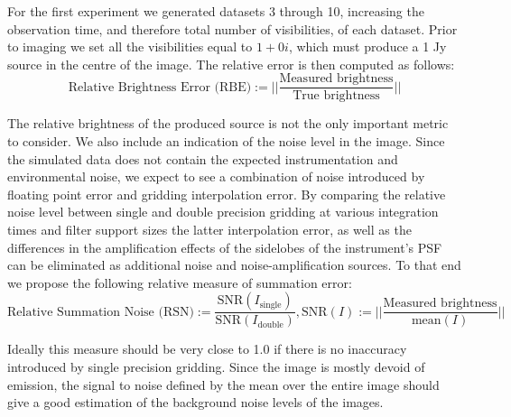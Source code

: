 For the first experiment we generated datasets 3 through 10, increasing the observation time, and therefore total number of visibilities, of each dataset. Prior to imaging we set all the visibilities 
equal to $1+0i$, which must produce a 1 Jy source in the centre of the image. The relative error is then computed as
follows:
\begin{equation}
 \text{Relative Brightness Error (RBE)} := ||\frac{\text{Measured brightness}}{\text{True brightness}}||
\end{equation}

The relative brightness of the produced source is not the only important metric to consider. We also include an indication of the noise level in the image. Since the simulated data does not contain the expected
instrumentation and environmental noise, we expect to see a combination of noise introduced by floating point error and gridding interpolation error. By comparing the relative noise level between single and double 
precision gridding at various integration times and filter support sizes the latter interpolation error, as well as the differences in the amplification effects of the sidelobes of the instrument's PSF can be 
eliminated as additional noise and noise-amplification sources. To that end we propose the following relative measure of summation error:
\begin{equation}
 \text{Relative Summation Noise (RSN)} := \frac{\text{SNR}(I_\text{single})}{\text{SNR}(I_\text{double})}, \text{SNR}(I) := ||\frac{\text{Measured brightness}}{\text{mean}(I)}||
\end{equation}

Ideally this measure should be very close to 1.0 if there is no inaccuracy introduced by single precision gridding. Since the image is mostly devoid of emission, the signal to noise defined by the mean
over the entire image should give a good estimation of the background noise levels of the images.
